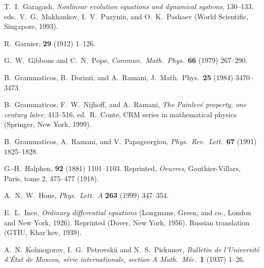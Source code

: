 \documentclass[10pt]{article}
\begin{document}
\begin{thebibliography}{99}
 T.~I.~Garagash,
{\it Nonlinear evolution equations and dynamical systems},
130--133,
eds.~V.~G.~Makhankov, I.~V.~Puzynin, and O.~K.~Pashaev
(World Scientific, Singapore, 1993).

 R.~Garnier,
{\it \AnnENS} {\bf 29} (1912) 1--126.

 G.~W.~Gibbons and C.~N.~Pope,
{\it Commun.~Math.~Phys.}~{\bf 66} (1979) 267--290.

B.~Grammaticos, B.~Dorizzi, and A.~Ramani,
J.~Math.~Phys.~{\bf 25} (1984) 3470--3473.

 B.~Grammaticos, F.~W.~Nijhoff, and A.~Ramani,
{\it The Painlev\'e property, one century later}, 
413--516,
ed.~R.~Conte,
CRM series in mathematical physics (Springer, New York, 1999).

 B.~Grammaticos, A.~Ramani, and V.~Papageorgiou,
{\it Phys.~Rev.~Lett.}~{\bf 67} (1991) 1825--1828.

 G.-H.~Halphen,
{\it \CRAS} {\bf 92} (1881) 1101--1103.
Reprinted, {\it O$\!$euvres}, Gauthier-Villars, Paris, tome 2, 475--477 (1918).

 A.~N.~W.~Hone,
{\it Phys.~Lett.~A} {\bf 263} (1999) 347--354.

 E.~L.~Ince,
{\it Ordinary differential equations}
(Longmans, Green, and co., London and New York, 1926).
Reprinted (Dover, New York, 1956).
Russian translation (GTIU, Khar'kov, 1939).

 A.~N.~Kolmogorov, I.~G.~Petrovskii and N.~S.~Piskunov,
{\it Bulletin de l'Universit\'e d'\'Etat de Moscou, s\'erie internationale,
section A Math.~M\'ec.}~{\bf 1} (1937) 1--26.


\end{thebibliography}
\end{document}
